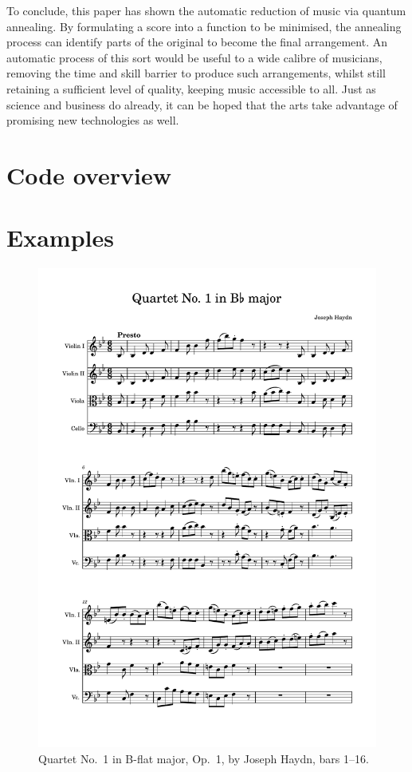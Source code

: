\documentclass[12pt]{article}
\theoremstyle{definition}
\begin{document}
To conclude, this paper has shown the automatic reduction of music via quantum annealing. By formulating a score into a function to be minimised, the annealing process can identify parts of the original to become the final arrangement. An automatic process of this sort would be useful to a wide calibre of musicians, removing the time and skill barrier to produce such arrangements, whilst still retaining a sufficient level of quality, keeping music accessible to all. Just as science and business do already, it can be hoped that the arts take advantage of promising new technologies as well.

\printbibliography[heading=bibintoc]

\clearpage
\appendix

\section{Code overview}
\label{app:code}

\section{Examples}
\label{app:examples}

\begin{figure}
    \includegraphics[width=\textwidth,page=1]{haydn-score.pdf}
    \caption{Quartet No.\ 1 in B-flat major, Op.\ 1, by Joseph Haydn, bars 1--16.}
\end{figure}
\end{document}
